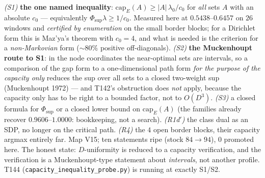 \documentclass[11pt,a4paper]{article}
\begin{document}
\begin{keybox}
\emph{(S1)} \textbf{the one named inequality}:
$\mathrm{cap}_E(A)\ge|A|\,\lambda_0/c_0$ for \emph{all} sets $A$ with an absolute $c_0$ ---
equivalently $\Phi_{\sup}\lambda\ge1/c_0$. Measured here at $0.5438$--$0.6457$ on $26$ windows
and \emph{certified by enumeration} on the small border blocks; for a Dirichlet form this is
Maz'ya's theorem with $c_0=4$, and what is needed is the criterion for a \emph{non-Markovian}
form ($\sim80\%$ positive off-diagonals). \emph{(S2)} \textbf{the Muckenhoupt route to S1}: in
the node coordinates the near-optimal sets are intervals, so a comparison of the gap form to a
one-dimensional path form \emph{for the purpose of the capacity only} reduces the sup over all
sets to a closed two-weight sup (Muckenhoupt 1972) --- and T142's obstruction does \emph{not}
apply, because the capacity only has to be right to a bounded factor, not to $O(D^3)$.
\emph{(S3)} a closed formula for $\Phi_{\sup}$ or a closed lower bound on
$\mathrm{cap}_E(A)$ (the families already recover $0.9606$--$1.0000$: bookkeeping, not a
search). \emph{(R1d$'$)} the class dual as an SDP, no longer on the critical path. \emph{(R4)}
the $4$ open border blocks, their capacity argmax entirely far. Map V15; ten statements ripe
(stock $84\to94$), $0$ promoted here. The honest state: $D$-uniformity is reduced to a capacity
verification, and the verification is a Muckenhoupt-type statement about \emph{intervals}, not
another profile. T144 (\texttt{capacity\_inequality\_probe.py}) is running at exactly S1/S2.
\end{keybox}
\end{document}
